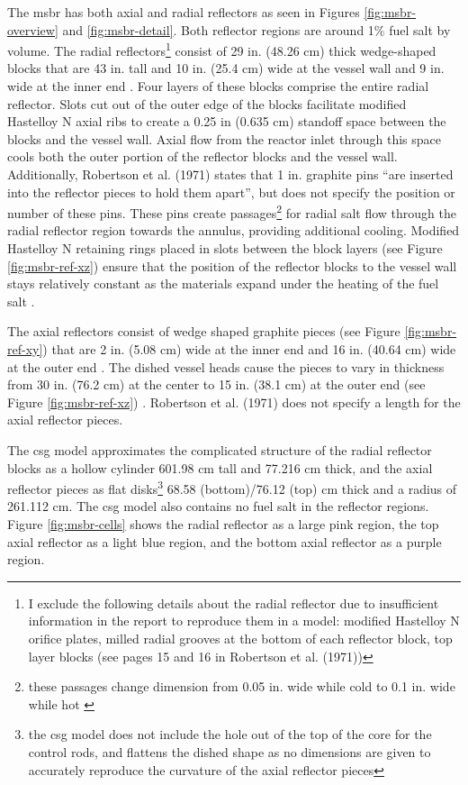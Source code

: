 The \Gls{msbr} has both axial and radial reflectors as seen in Figures
\ref{fig:msbr-overview} and \ref{fig:msbr-detail}. Both reflector regions are around 1\% fuel salt by volume. The radial
reflectors\footnote{I exclude the following details about the radial reflector
due to insufficient information in the report to reproduce them in a model:
modified Hastelloy N orifice plates, milled radial grooves at the bottom of each
reflector block, top layer blocks (see pages 15 and 16 in Robertson et al.
(1971))} consist of 29 in. (48.26 cm) thick wedge-shaped blocks that are 43 in. tall and 10 in. (25.4 cm) wide at the vessel wall and 9 in. wide at the inner end \cite{robertson_conceptual_1971}.
Four layers of these blocks comprise the entire radial reflector. Slots cut out
of the outer edge of the blocks facilitate modified Hastelloy N axial ribs to create a
0.25 in (0.635 cm) standoff space between the blocks and the vessel wall. Axial
flow from the reactor inlet through this space cools both the outer portion of
the reflector blocks and the vessel wall. Additionally, Robertson et al. (1971)
states that 1 in. graphite pins ``are inserted into the reflector pieces to hold
them apart'', but does not specify the position or number of these pins. These
pins create passages\footnote{these passages change dimension from 0.05 in. wide
while cold to 0.1 in. wide while hot \cite{robertson_conceptual_1971}} for
radial salt flow through the radial reflector region towards the annulus,
providing additional cooling. Modified Hastelloy N retaining rings placed in slots
between the block layers (see Figure \ref{fig:msbr-ref-xz}) ensure that the
position of the reflector blocks to the vessel wall stays relatively constant as
the materials expand under the heating of the fuel salt
\cite{robertson_conceptual_1971}.

The axial reflectors consist of wedge shaped graphite pieces (see Figure
\ref{fig:msbr-ref-xy}) that are 2 in. (5.08 cm) wide at the inner end and 16 in.
(40.64 cm) wide at the outer end \cite{robertson_conceptual_1971}. The dished
vessel heads cause the pieces to vary in thickness from 30 in. (76.2 cm) at the
center to 15 in. (38.1 cm) at the outer end (see Figure
\ref{fig:msbr-ref-xz}) \cite{robertson_conceptual_1971}. Robertson et al. (1971)
does not specify a length for the axial reflector pieces. 

The \Gls{csg} model approximates the complicated structure of the radial
reflector blocks as a hollow cylinder 601.98 cm tall and 77.216 cm thick, and
the axial reflector pieces as flat disks\footnote{the \Gls{csg} model does not
include the hole out of the top of the core for the control rods, and flattens
the dished shape as no dimensions are given to accurately reproduce the curvature
of the axial reflector pieces} 68.58 (bottom)/76.12 (top) cm thick and a radius
of 261.112 cm. The \Gls{csg} model also contains no fuel salt in the reflector
regions. Figure \ref{fig:msbr-cells} shows the radial reflector as a large pink
region, the top axial reflector as a light blue region, and the bottom axial
reflector as a purple region.

